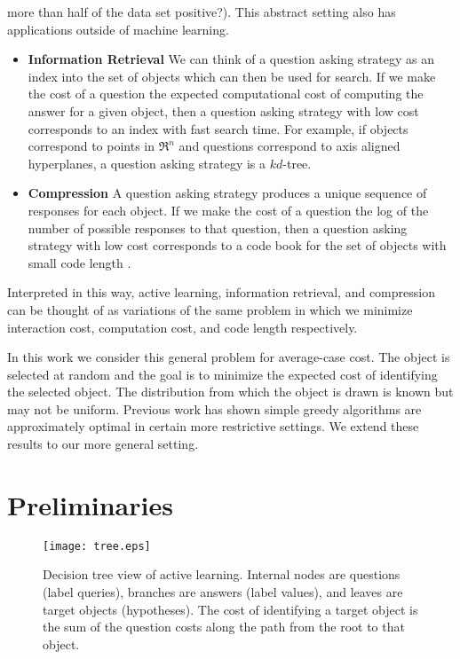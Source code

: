 \documentclass{article}
\begin{document}
more than half of the data set positive?).  This abstract setting also
has applications outside of machine learning.
\begin{itemize}
\item \textbf{Information Retrieval} We can think of a question asking
strategy as an index into the set of objects which can then be used
for search. If we make the cost of a question the expected
computational cost of computing the answer for a given object, then
a question asking strategy with low cost corresponds to an index
with fast search time.  For example, if objects correspond to points
in $\Re^n$ and questions correspond to axis aligned hyperplanes, a
question asking strategy is a $kd$-tree.
\item \textbf{Compression} A question asking strategy produces a
unique sequence of responses for each object.  If we make the cost
of a question the log of the number of possible
responses to that question,
then a question asking strategy with low cost
corresponds to a code book for the set of objects 
with small code length \citep{coverthomas}.
\end{itemize}
Interpreted in this way, active learning, information retrieval, and
compression can be thought of as variations of the same problem
in which we minimize interaction cost, computation cost, and code length
respectively.  

In this work we consider this general problem for average-case cost.
The object is selected at random and the goal is to minimize the
expected cost of identifying the selected object.  The distribution from which
the object is drawn is known but may not be uniform.  Previous work
\citep{optimalsplit, greedy, approxoptimal, 
decisiontreesentity, approxdecision}
has shown simple greedy algorithms are approximately optimal
in certain more restrictive settings.  We extend these results to our
more general setting.  

\section{Preliminaries}


\begin{figure}[t]
\label{tree}
\centering
\texttt{[image: tree.eps]}
\caption{Decision tree view of active learning.  Internal nodes
are questions (label queries), branches are answers (label values),
and leaves are target objects (hypotheses).  The cost of identifying
a target object is the sum of the question costs along the
path from the root to that object.}
\end{figure}
\end{document}
